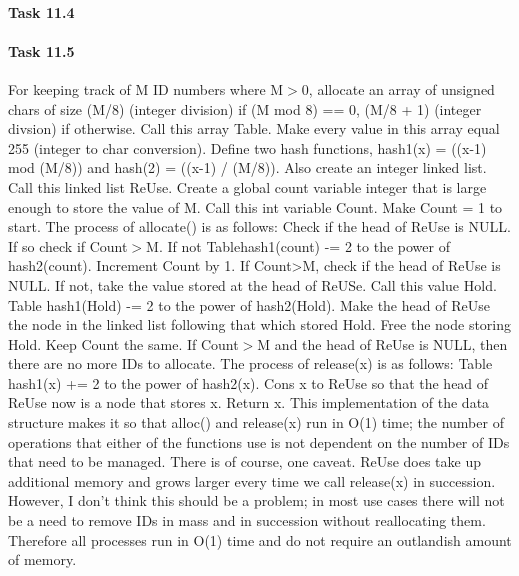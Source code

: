 \documentclass[14pt]{article}
\begin{document}
\paragraph{Task 11.4}
\paragraph{Task 11.5}
For keeping track of M ID numbers where M$>$0, allocate an array of unsigned chars of size (M/8) (integer division) if (M mod 8) == 0, (M/8 + 1) (integer divsion) if otherwise. Call this array Table. Make every value in this array equal 255 (integer to char conversion). Define two hash functions, hash1(x) = ((x-1) mod (M/8)) and hash(2) = ((x-1) / (M/8)). Also create an integer linked list. Call this linked list ReUse. Create a global count variable integer that is large enough to store the value of M. Call this int variable Count. Make Count = 1 to start. The process of allocate() is as follows: Check if the head of ReUse is NULL. If so check if Count$>$M. If not Table\lbrack hash1(count) \rbrack -= 2 to the power of hash2(count). Increment Count by 1. If Count>M, check if the head of ReUse is NULL. If not, take the value stored at the head of ReUSe. Call this value Hold. Table \lbrack hash1(Hold) \rbrack -= 2 to the power of hash2(Hold). Make the head of ReUse the node in the linked list following that which stored Hold. Free the node storing Hold. Keep Count the same. If Count$>$M and the head of ReUse is NULL, then there are no more IDs to allocate. The process of release(x) is as follows: Table \lbrack hash1(x) \rbrack += 2 to the power of hash2(x). Cons x to ReUse so that the head of ReUse now is a node that stores x. Return x. This implementation of the data structure makes it so that alloc() and release(x) run in O(1) time; the number of operations that either of the functions use is not dependent on the number of IDs that need to be managed. There is of course, one caveat. ReUse does take up additional memory and grows larger every time we call release(x) in succession. However, I don't think this should be a problem; in most use cases there will not be a need to remove IDs in mass and in succession without reallocating them. Therefore all processes run in O(1) time and do not require an outlandish amount of memory.    
\label{mylastpagelabel}
\end{document}

